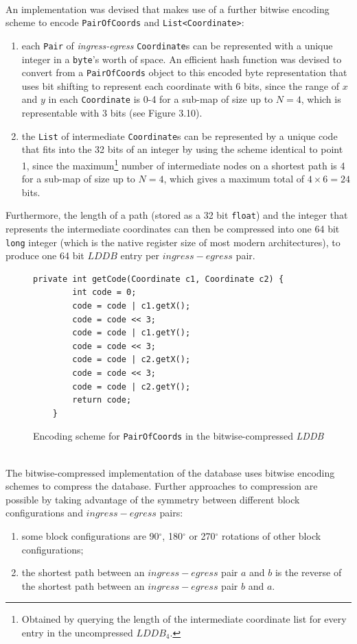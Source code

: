 \documentclass[12pt,notitlepage]{report}
\begin{document}
\\
\noindent
An implementation was devised that makes use of a further bitwise encoding scheme to encode {\tt PairOfCoords} and {\tt List<Coordinate>}:
\begin{enumerate}
\item each {\tt Pair} of {\em ingress-egress} {\tt Coordinate}s can be represented with a unique integer in a {\tt byte}'s worth of space. An efficient hash function was devised to convert from a {\tt PairOfCoords} object to this encoded byte representation that uses bit shifting to represent each coordinate with 6 bits, since the range of $x$ and $y$ in each {\tt Coordinate} is 0-4 for a sub-map of size up to {$N=4$}, which is representable with 3 bits (see Figure 3.10).
\item the {\tt List} of intermediate {\tt Coordinate}s can be represented by a unique code that fits into the 32 bits of an integer by using the scheme identical to point 1, since the maximum\footnote{Obtained by querying the length of the intermediate coordinate list for every entry in the uncompressed $LDDB_{4}$.} number of intermediate nodes on a shortest path is 4 for a sub-map of size up to {$N=4$}, which gives a maximum total of $4 \times 6 = 24$ bits. 
\end{enumerate}

\noindent
Furthermore, the length of a path (stored as a 32 bit {\tt float}) and the integer that represents the intermediate coordinates can then be compressed into one 64 bit {\tt long} integer (which is the native register size of most modern architectures), to produce one 64 bit $LDDB$ entry per $ingress-egress$ pair.\\

\begin{figure}
\begin{lstlisting}
private int getCode(Coordinate c1, Coordinate c2) {
		int code = 0;
		code = code | c1.getX();
		code = code << 3;
		code = code | c1.getY();
		code = code << 3;
		code = code | c2.getX();
		code = code << 3;
		code = code | c2.getY();
		return code;	
	}
\end{lstlisting}
\caption{Encoding scheme for {\tt PairOfCoords} in the bitwise-compressed {\em LDDB}}
\end{figure}

\\
\noindent
The bitwise-compressed implementation of the database uses bitwise encoding schemes to compress the database. Further approaches to compression are possible by taking advantage of the symmetry between different block configurations and $ingress-egress$ pairs:
\begin{enumerate}
\item some block configurations are 90$^{\circ}$,  180$^{\circ}$ or 270$^{\circ}$ rotations of other block configurations;
\item the shortest path between an $ingress-egress$ pair $a$ and $b$ is the reverse of the shortest path between an $ingress-egress$ pair $b$ and $a$. 
\end{enumerate}
\end{document}
